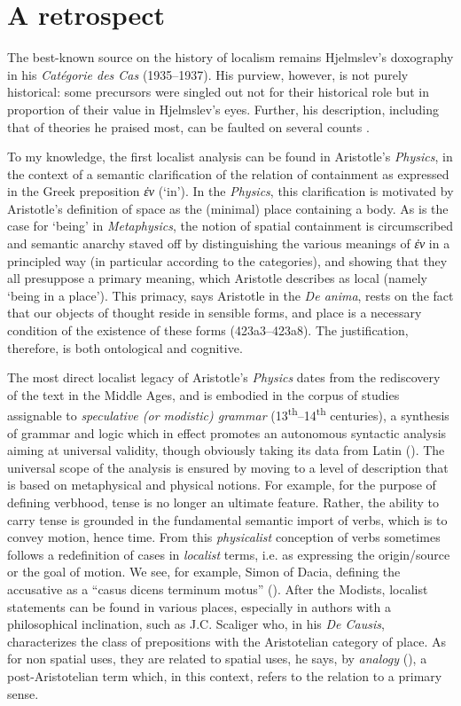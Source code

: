 \documentclass[english,output=paper,colorlinks,citecolor=brown]{../langscibook}
\begin{document}
\section{A retrospect}
The best-known source on the history of localism remains Hjelmslev’s doxography in his \textit{Catégorie des Cas} (1935--1937). His purview, however, is not purely historical: some precursors were singled out not for their historical role but in proportion of their value in Hjelmslev’s eyes. Further, his description, including that of theories he praised most, can be faulted on several counts \citep{Fortis2018Anderson}. 

To my knowledge, the first localist analysis can be found in Aristotle’s \textit{Physics}, in the context of a semantic clarification of the relation of containment as expressed in the Greek preposition \textit{ἐν} (‘in’). In the \textit{Physics}, this clarification is motivated by Aristotle’s definition of space as the (minimal) place containing a body. As is the case for ‘being’ in \textit{Metaphysics}, the notion of spatial containment is circumscribed and semantic anarchy staved off by distinguishing the various meanings of \textit{ἐν} in a principled way (in particular according to the categories), and showing that they all presuppose a primary meaning, which Aristotle describes as local (namely ‘being in a place’). This primacy, says Aristotle in the \textit{De anima}, rests on the fact that our objects of thought reside in sensible forms, and place is a necessary condition of the existence of these forms (423a3--423a8). The justification, therefore, is both ontological and cognitive.

The most direct localist legacy of Aristotle’s \textit{Physics} dates from the rediscovery of the text in the Middle Ages, and is embodied in the corpus of studies assignable to \textit{speculative (or modistic) grammar} (13\textsuperscript{th}--14\textsuperscript{th} centuries), a synthesis of grammar and logic which in effect promotes an autonomous syntactic analysis aiming at universal validity, though obviously taking its data from Latin (\citealt[29]{Bursill-Hall1971}). The universal scope of the analysis is ensured by moving to a level of description that is based on metaphysical and physical notions. For example, for the purpose of defining verbhood, tense is no longer an ultimate feature. Rather, the ability to carry tense is grounded in the fundamental semantic import of verbs, which is to convey motion, hence time. From this \textit{physicalist} conception of verbs sometimes follows a redefinition of cases in \textit{localist} terms, i.e. as expressing the origin\slash source or the goal of motion. We see, for example, Simon of Dacia, defining the accusative as a “casus dicens terminum motus” (\citealt{Kelly1977}). After the Modists, localist statements can be found in various places, especially in authors with a philosophical inclination, such as J.C. Scaliger who, in his \textit{De Causis}, characterizes the class of prepositions with the Aristotelian category of place. As for non spatial uses, they are related to spatial uses, he says, by \textit{analogy} (\citeyear[152]{Scaliger2018}), a post-Aristotelian term which, in this context, refers to the relation to a primary sense.
\end{document}

